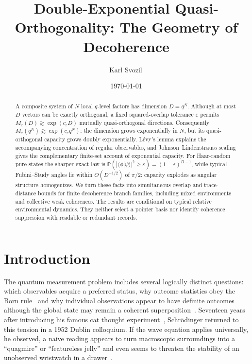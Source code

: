 \documentclass[aps,pra,reprint,superscriptaddress,nofootinbib,longbibliography]{revtex4-2}
\newcommand{\eps}{\varepsilon}
\begin{document}
\title{Double-Exponential Quasi-Orthogonality:
The Geometry of Decoherence}

\author{Karl Svozil\,}

\date{\today}

\begin{abstract}
A composite system of $N$ local $q$-level factors has dimension $D=q^N$.
Although at most $D$ vectors can be exactly orthogonal, a fixed squared-overlap
tolerance $\eps$ permits $M_\eps(D)\gtrsim\exp(c_\eps D)$ mutually
quasi-orthogonal directions.  Consequently
$M_\eps(q^N)\gtrsim\exp(c_\eps q^N)$: the dimension grows exponentially in
$N$, but its quasi-orthogonal capacity grows doubly exponentially.
L\'evy's lemma explains the accompanying concentration of regular observables,
and Johnson--Lindenstrauss scaling gives the complementary finite-set account
of exponential capacity.  For Haar-random pure states the sharper exact law
is
$\mathbb P(|\langle\phi|\psi\rangle|^2\geq\eps)=(1-\eps)^{D-1}$,
while typical Fubini--Study angles lie within $O(D^{-1/2})$ of $\pi/2$:
capacity explodes as angular structure homogenizes.  We turn these facts into
simultaneous overlap and trace-distance bounds for finite decoherence branch
families, including mixed environments and collective weak coherences.  The
results are conditional on typical relative environmental dynamics.  They
neither select a pointer basis nor identify coherence suppression with
readable or redundant records.
\end{abstract}

\maketitle

\section{Introduction}

The quantum measurement problem includes several logically distinct
questions: which observables acquire a preferred status, why outcome
statistics obey the Born rule~\cite{gleason,Wright_2019} and why individual observations appear to
have definite outcomes although the global state may remain a coherent
superposition~\cite{everett,schlosshauer-2007,schlosshauer-2019}.
Seventeen years after introducing his famous cat thought
experiment~\cite{schrodinger-gwsidqm1}, Schr\"odinger returned to this tension
in a 1952 Dublin colloquium.  If the wave equation applies universally, he
observed, a naive reading appears to turn macroscopic surroundings into a
``quagmire'' or ``featureless jelly'' and even seems to threaten the stability
of an unobserved wristwatch in a drawer~\cite{schroedinger-interpretation}.
\end{document}
